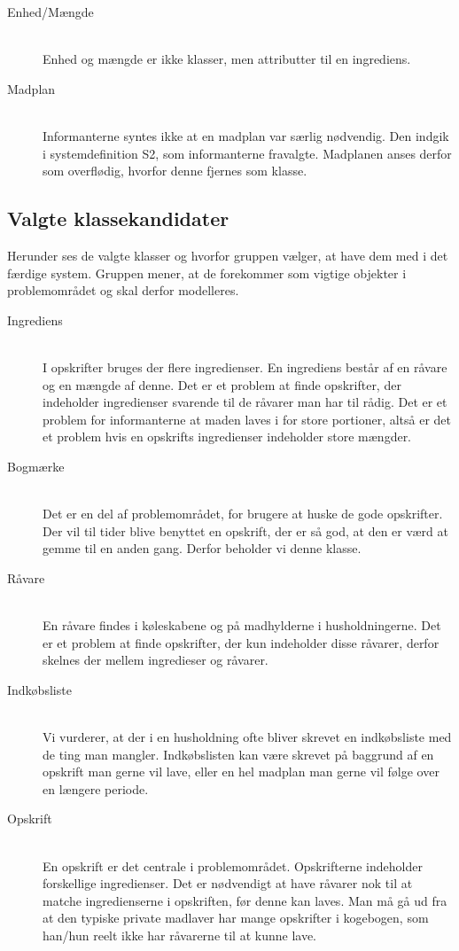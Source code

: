\begin{description}
\item[Enhed/Mængde] \hfill \\
Enhed og mængde er ikke klasser, men attributter til en ingrediens.

\item[Madplan] \hfill \\
Informanterne syntes ikke at en madplan var særlig nødvendig. Den indgik i systemdefinition S2, som informanterne fravalgte. Madplanen anses derfor som overflødig, hvorfor denne fjernes som klasse.
\end{description}

\subsection{Valgte klassekandidater}
Herunder ses de valgte klasser og hvorfor gruppen vælger, at have dem med i det færdige system. Gruppen mener, at de forekommer som vigtige objekter i problemområdet og skal derfor modelleres.

\begin{description}
\item[Ingrediens] \hfill \\ 
I opskrifter bruges der flere ingredienser. En ingrediens består af en råvare og en mængde af denne. Det er et problem at finde opskrifter, der indeholder ingredienser svarende til de råvarer man har til rådig. Det er et problem for informanterne at maden laves i for store portioner, altså er det et problem hvis en opskrifts ingredienser indeholder store mængder.

\item[Bogmærke] \hfill \\
Det er en del af problemområdet, for brugere at huske de gode opskrifter. Der vil til tider blive benyttet en opskrift, der er så god, at den er værd at gemme til en anden gang. Derfor beholder vi denne klasse.

\item[Råvare] \hfill \\
En råvare findes i køleskabene og på madhylderne i husholdningerne. Det er et problem at finde opskrifter, der kun indeholder disse råvarer, derfor skelnes der mellem ingredieser og råvarer.

\item[Indkøbsliste] \hfill \\
Vi vurderer, at der i en husholdning ofte bliver skrevet en indkøbsliste med de ting man mangler. Indkøbslisten kan være skrevet på baggrund af en opskrift man gerne vil lave, eller en hel madplan man gerne vil følge over en længere periode.

\item[Opskrift] \hfill \\
En opskrift er det centrale i problemområdet. Opskrifterne indeholder forskellige ingredienser. Det er nødvendigt at have råvarer nok til at matche ingredienserne i opskriften, før denne kan laves. Man må gå ud fra at den typiske private madlaver har mange opskrifter i kogebogen, som han/hun reelt ikke har råvarerne til at kunne lave.
\end{description}

